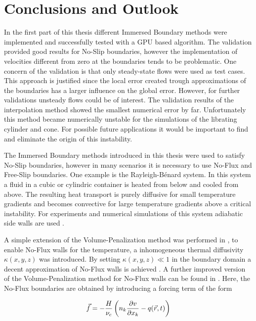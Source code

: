 \chapter*{Conclusions and Outlook}

In the first part of this thesis different Immersed Boundary methods were
implemented and successfully tested with a GPU based algorithm.
The validation provided good results for No-Slip boundaries, however the implementation of velocities different from zero at the boundaries tends to be problematic.
One concern of the validation is that only steady-state flows were used as test cases.
This approach is justified since the local error created trough approximations of the boundaries
has a larger influence on the global error.
However, for further validations unsteady flows could be of interest.
The validation results of the interpolation method showed the smallest numerical error by far.
Unfortunately this method became numerically unstable for the simulations of the librating cylinder and cone.
For possible future applications it would be important to find and eliminate the origin of this instability.

The Immersed Boundary methods introduced in this thesis were used to satisfy No-Slip boundaries, however
in many scenarios it is necessary to use No-Flux and Free-Slip boundaries.
One example is the Rayleigh-B\'{e}nard system.
In this system a fluid in a cubic or cylindric container is heated from below and cooled from above.
The resulting heat transport is purely diffusive for small temperature gradients and
becomes convective for large temperature gradients above a critical instability.
For experiments and numerical simulations of this system adiabatic side walls are used \citep{Lulff2011}.

A simple extension of the Volume-Penalization method was performed in \citep{Lulff2011},
to enable No-Flux walls for the temperature, a inhomogeneous thermal diffusivity $\kappa (x, y, z)$ was introduced.
By setting $\kappa(x, y, z) \ll 1$ in the boundary domain  a decent approximation of No-Flux walls  is achieved \citep{Lulff2011}.
A further improved version of the Volume-Penalization method for No-Flux walls can be found in \citep{Brown-Dymkoski2014}.
Here, the No-Flux boundaries are obtained by introducing a forcing term of the form

\begin{align}
    \vec{f}  = -\frac{H}{\nu_c}\left( n_k\pdn[v]{x_k} - q(\vec{r}, t) \right)
\end{align}

